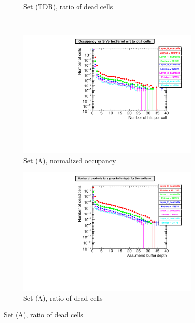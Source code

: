 \begin{figure}[htbp]
\begin{subfigure}[b]{0.49\textwidth}
   \caption{Set (TDR), ratio of dead cells}
   \end{subfigure}\\
  \begin{subfigure}[b]{0.49\textwidth}
   \centering
    \includegraphics[width=\textwidth]{Figures/Pairs/Appendix/occupancy_numcells_SiVertexBarrel_ILC250_SetA_corrected_Barrel_size.pdf}
   \caption{Set (A), normalized occupancy}
   \end{subfigure}
   \hfill
    \begin{subfigure}[b]{0.49\textwidth}
   \centering
    \includegraphics[width=\textwidth]{Figures/Pairs/Appendix/occupancy_deadcells_SiVertexBarrel_ILC250_SetA_corrected_Barrel_size.pdf}
   \caption{Set (A), ratio of dead cells}
   \end{subfigure}
     \end{figure}
